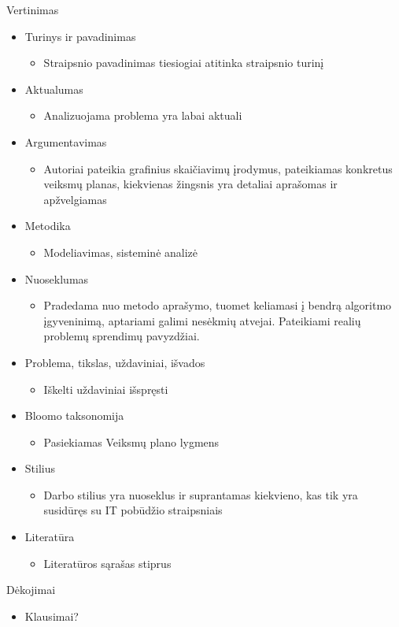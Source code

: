 \documentclass{beamer}
\begin{document}
  \begin{frame}[allowframebreaks=0.8]{Vertinimas}

    \begin{itemize}
      \item Turinys ir pavadinimas
        \begin{itemize}
          \item Straipsnio pavadinimas tiesiogiai atitinka straipsnio turinį
        \end{itemize}
      \item Aktualumas
        \begin{itemize}
          \item Analizuojama problema yra labai aktuali
        \end{itemize}
      \item Argumentavimas
        \begin{itemize}
          \item Autoriai pateikia grafinius skaičiavimų įrodymus, pateikiamas konkretus veiksmų planas, kiekvienas žingsnis yra detaliai aprašomas ir apžvelgiamas
        \end{itemize}
      \item Metodika
        \begin{itemize}
          \item Modeliavimas, sisteminė analizė
        \end{itemize}
      \item Nuoseklumas
        \begin{itemize}
          \item Pradedama nuo metodo aprašymo, tuomet keliamasi į bendrą algoritmo įgyveninimą, aptariami galimi nesėkmių atvejai. Pateikiami realių problemų sprendimų pavyzdžiai.
        \end{itemize}
      \item Problema, tikslas, uždaviniai, išvados
        \begin{itemize}
          \item Iškelti uždaviniai išspręsti
        \end{itemize}
      \item Bloomo taksonomija
        \begin{itemize}
          \item Pasiekiamas Veiksmų plano lygmens
        \end{itemize}
      \item Stilius
        \begin{itemize}
          \item Darbo stilius yra nuoseklus ir suprantamas kiekvieno, kas tik yra susidūręs su IT pobūdžio straipsniais
        \end{itemize}
      \item Literatūra
        \begin{itemize}
          \item Literatūros sąrašas stiprus
        \end{itemize}
    \end{itemize}

  \end{frame}

  \begin{frame}{Dėkojimai}

    \begin{itemize}
      \item Klausimai?
    \end{itemize}
  \end{frame}
\end{document}
